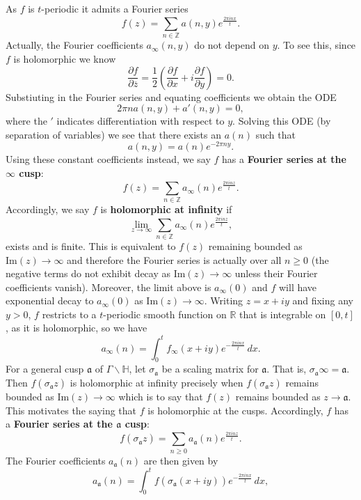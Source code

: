 \documentclass[12pt]{book}
\theoremstyle{definition}\newframedtheorem{method}{Method}
\newcommand{\mf}{\mathfrak}
\newcommand{\Z}{\mathbb{Z}}
\newcommand{\R}{\mathbb{R}}
\renewcommand{\H}{\mathbb{H}}
\newcommand{\s}{\sigma}
\newcommand{\G}{\Gamma}
\newcommand{\del}{\partial}
\newcommand{\<}{\langle}
\renewcommand{\>}{\rangle}
\newcommand{\conj}{\overline}
\renewcommand{\Im}{\mathrm{Im}}
\newcommand{\GH}{\G\backslash\H}
\begin{document}
      As $f$ is $t$-periodic it admits a Fourier series
      \[
        f(z) = \sum_{n \in \Z}a(n,y)e^{\frac{2\pi inx}{t}}.
      \]
      Actually, the Fourier coefficients $a_{\infty}(n,y)$ do not depend on $y$. To see this, since $f$ is holomorphic we know
      \[
        \frac{\del f}{\del\conj{z}} = \frac{1}{2}\left(\frac{\del f}{\del x}+i\frac{\del f}{\del y}\right) = 0.
      \]
      Substiuting in the Fourier series and equating coefficients we obtain the ODE
      \[
        2\pi na(n,y)+a'(n,y) = 0,
      \]
      where the $'$ indicates differentiation with respect to $y$. Solving this ODE (by separation of variables) we see that there exists an $a(n)$ such that
      \[
        a(n,y) = a(n)e^{-2\pi ny}.
      \]
      Using these constant coefficients instead, we say $f$ has a \textbf{Fourier series at the $\infty$ cusp}:
      \[
        f(z) = \sum_{n \in \Z}a_{\infty}(n)e^{\frac{2\pi inz}{t}}.
      \]
      Accordingly, we say $f$ is \textbf{holomorphic at infinity} if
      \[
        \lim_{z \to \infty}\sum_{n \in \Z}a_{\infty}(n)e^{\frac{2\pi inz}{t}},
      \]
      exists and is finite. This is equivalent to $f(z)$ remaining bounded as $\Im(z) \to \infty$ and therefore the Fourier series is actually over all $n \ge 0$ (the negative terms do not exhibit decay as $\Im(z) \to \infty$ unless their Fourier coefficients vanish). Moreover, the limit above is $a_{\infty}(0)$ and $f$ will have exponential decay to $a_{\infty}(0)$ as $\Im(z) \to \infty$. Writing $z = x+iy$ and fixing any $y > 0$, $f$ restricts to a $t$-periodic smooth function on $\R$ that is integrable on $[0,t]$, as it is holomorphic, so we have
      \[
        a_{\infty}(n) = \int_{0}^{t}f_{\infty}(x+iy)e^{-\frac{2\pi inx}{t}}\,dx.
      \]
      For a general cusp $\mf{a}$ of $\GH$, let $\s_{\mf{a}}$ be a scaling matrix for $\mf{a}$. That is, $\s_{\mf{a}}\infty = \mf{a}$. Then $f(\s_{\mf{a}}z)$ is holomorphic at infinity precisely when $f(\s_{\mf{a}}z)$ remains bounded as $\Im(z) \to \infty$ which is to say that $f(z)$ remains bounded as $z \to \mf{a}$. This motivates the saying that $f$ is holomorphic at the cusps. Accordingly, $f$ has a \textbf{Fourier series at the $\mf{a}$ cusp}\index{Fourier series at the $\mf{a}$ cusp}:
      \[
        f(\s_{\mf{a}}z) = \sum_{n \ge 0}a_{\mf{a}}(n)e^{\frac{2\pi inz}{t}}.
      \]
      The Fourier coefficients $a_{\mf{a}}(n)$ are then given by
      \[
        a_{\mf{a}}(n) = \int_{0}^{t}f(\s_{\mf{a}}(x+iy))e^{-\frac{2\pi inx}{t}}\,dx,
      \]
\end{document}
